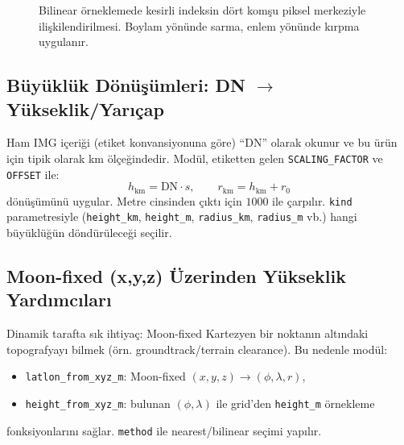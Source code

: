 \begin{figure}[H]
\centering
\caption{Bilinear örneklemede kesirli indeksin dört komşu piksel merkeziyle ilişkilendirilmesi.
Boylam yönünde sarma, enlem yönünde kırpma uygulanır.}
\end{figure}

\subsection*{Büyüklük Dönüşümleri: DN \(\rightarrow\) Yükseklik/Yarıçap}
Ham IMG içeriği (etiket konvansiyonuna göre) ``DN'' olarak okunur ve bu ürün için tipik olarak km ölçeğindedir.
Modül, etiketten gelen \texttt{SCALING\_FACTOR} ve \texttt{OFFSET} ile:
\[
h_{\text{km}} = \text{DN}\cdot s,\qquad
r_{\text{km}} = h_{\text{km}} + r_0
\]
dönüşümünü uygular. Metre cinsinden çıktı için \(1000\) ile çarpılır.
\texttt{kind} parametresiyle (\texttt{height\_km}, \texttt{height\_m}, \texttt{radius\_km}, \texttt{radius\_m} vb.)
hangi büyüklüğün döndürüleceği seçilir.

\subsection*{Moon-fixed (x,y,z) Üzerinden Yükseklik Yardımcıları}
Dinamik tarafta sık ihtiyaç: Moon-fixed Kartezyen bir noktanın altındaki topografyayı bilmek
(örn. groundtrack/terrain clearance). Bu nedenle modül:
\begin{itemize}
  \item \texttt{latlon\_from\_xyz\_m}: Moon-fixed \((x,y,z)\rightarrow(\phi,\lambda,r)\),
  \item \texttt{height\_from\_xyz\_m}: bulunan \((\phi,\lambda)\) ile grid’den \texttt{height\_m} örnekleme
\end{itemize}
fonksiyonlarını sağlar. \texttt{method} ile nearest/bilinear seçimi yapılır.

